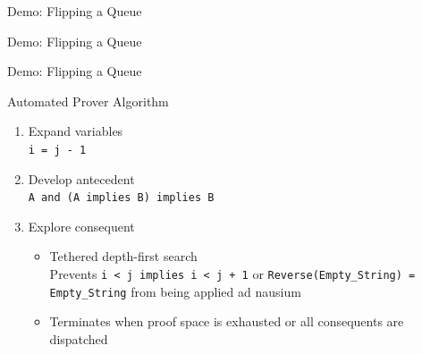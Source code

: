 \begin{frame}{Demo: Flipping a Queue}
~
\end{frame}

\begin{frame}{Demo: Flipping a Queue}
\end{frame}

\begin{frame}{Demo: Flipping a Queue}
\end{frame}


\begin{frame}{Automated Prover Algorithm}
	\begin{enumerate}
		\item Expand variables\\
			\texttt{i = j - 1}
		\item Develop antecedent\\
			\texttt{A and (A implies B) implies B}
		\item Explore consequent\\
		\begin{itemize}
			\item Tethered depth-first search\\
				Prevents \texttt{i < j implies i < j + 1} or \texttt{Reverse(Empty\_String) = Empty\_String} from being applied ad nausium
			\item Terminates when proof space is exhausted or all consequents are dispatched
		\end{itemize}
	\end{enumerate}
\end{frame}


